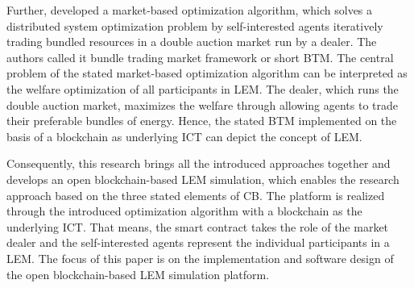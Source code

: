 Further,  developed a market-based optimization algorithm, 
which solves a distributed system optimization problem by self-interested agents iteratively 
trading bundled resources in a double auction market run by a dealer. The authors called it 
bundle trading market framework or short BTM. The central problem of the stated market-based 
optimization algorithm can be interpreted as the welfare optimization of all participants in LEM. 
The dealer, which runs the double auction market, maximizes the welfare through allowing agents 
to trade their preferable bundles of energy. Hence, the stated BTM implemented on the basis of a 
blockchain as underlying ICT can depict the concept of LEM.

Consequently, this research brings all the introduced approaches together 
and develops an open blockchain-based LEM simulation, which enables the research 
approach based on the three stated elements of CB. The platform is realized through 
the introduced optimization algorithm with a blockchain as the underlying ICT. 
That means, the smart contract takes the role of the market dealer and the self-interested 
agents represent the individual participants in a LEM. The focus of this paper is on the 
implementation and software design of the open blockchain-based LEM simulation platform.

\clearpage